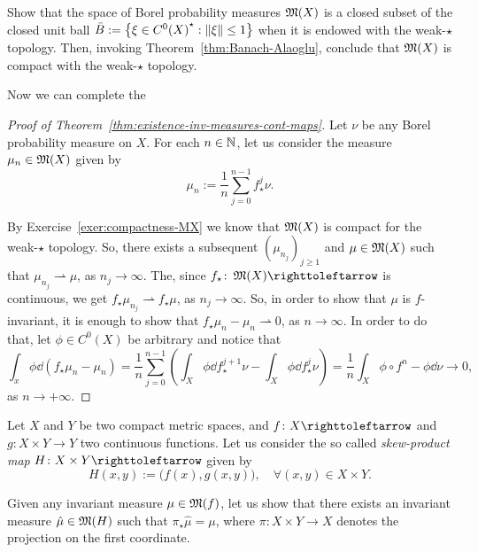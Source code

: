 \begin{exercise}\label{exer:compactness-MX}
  Show that the space of Borel probability measures $\operatorname{\mathfrak{M}}(X)$ is a closed subset of the closed unit ball $\bar B:=\left\{\xi\in {C^{0}(X)}^{\star} : \left\|{\xi}\right\|\leq 1\right\}$ when it is endowed with the weak-$\star$ topology. Then, invoking Theorem~\ref{thm:Banach-Alaoglu}, conclude that $\operatorname{\mathfrak{M}}(X)$ is compact with the weak-$\star$ topology.
\end{exercise}

Now we can complete the
\begin{proof}[Proof of Theorem~\ref{thm:existence-inv-measures-cont-maps}]
  Let $\nu$ be any Borel probability measure on $X$. For each $n\in\mathbb{N}$, let us consider the measure $\mu_{n}\in\operatorname{\mathfrak{M}}(X)$ given by
  \begin{displaymath}
    \mu_{n}:=\frac{1}{n}\sum_{j=0}^{n-1}f_{\star}^{j}\nu.
  \end{displaymath}

  By Exercise~\ref{exer:compactness-MX} we know that $\operatorname{\mathfrak{M}}(X)$ is compact for the weak-$\star$ topology. So, there exists a subsequent ${(\mu_{n_{j}})}_{j\geq 1}$ and $\mu\in\operatorname{\mathfrak{M}}(X)$ such that $\mu_{n_{j}}\rightharpoonup\mu$, as $n_{j}\to\infty$. The, since $f_{\star}\colon\M(X)\carr$ is continuous, we get $f_{\star}\mu_{n_{j}}\rightharpoonup f_{\star}\mu$, as $n_{j}\to\infty$. So, in order to show that $\mu$ is $f$-invariant, it is enough to show that $f_{\star}\mu_{n}-\mu_{n}\rightharpoonup 0$, as $n\to\infty$. In order to do that, let $\phi\in C^{0}(X)$ be arbitrary and notice that
  \begin{displaymath}
    \int_{x}\phi\dd(f_{\star}\mu_{n}-\mu_{n}) = \frac{1}{n}\sum_{j=0}^{n-1}\left(\int_{X}\phi\dd f_{\star}^{j+1}\nu -\int_{X}\phi\dd f^{j}_{\star}\nu\right) = \frac{1}{n}\int_{X}\phi\circ f^{n}-\phi\dd\nu\to 0,
  \end{displaymath}
  as $n\to+\infty$.
\end{proof}

\begin{exercise}
  Let $X$ and $Y$ be two compact metric spaces, and $f\colon X\carr$ and $g\colon X\times Y\to Y$ two continuous functions. Let us consider the so called \emph{skew-product map} $H\colon X\times Y\carr$ given by
  \begin{displaymath}
    H(x,y):=\big(f(x),g(x,y)\big), \quad\forall (x,y)\in X\times Y.
  \end{displaymath}

  Given any invariant measure $\mu\in\operatorname{\mathfrak{M}}(f)$, let us show that there exists an invariant measure $\hat\mu\in\operatorname{\mathfrak{M}}(H)$ such that $\pi_{\star}\hat\mu=\mu$, where $\pi\colon X\times Y\to X$ denotes the projection on the first coordinate.
\end{exercise}


